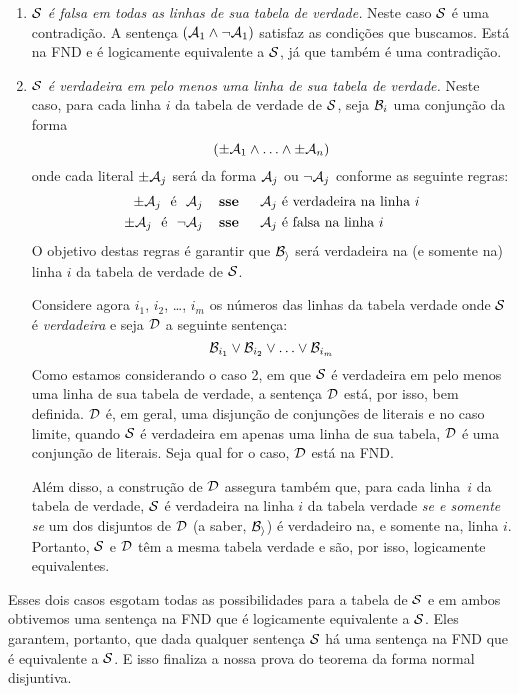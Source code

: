 	\begin{enumerate}
		\item \emph{$\mathcal{S}$ é falsa em todas as linhas de sua tabela de verdade.} Neste caso  $\mathcal{S}$ é uma contradição.
		A sentença $(\mathcal{A}_1 \wedge \neg \mathcal{A}_1)$ satisfaz as condições que buscamos.
		Está na FND e é logicamente equivalente a $\mathcal{S}$, já que também é uma contradição.
	
		\item\emph{$\mathcal{S}$ é verdadeira em pelo menos uma linha de sua tabela de verdade.}
		Neste caso, para cada linha $i$ da tabela de verdade de $\mathcal{S}$, seja $\mathcal{B}_i$ uma conjunção da forma
		$$(\pm\mathcal{A}_{1} \land \ldots \land \pm\mathcal{A}_{n})$$
		onde cada literal $\pm\mathcal{A}_{j}$ será da forma $\mathcal{A}_{j}$ ou $\neg\mathcal{A}_{j}$ conforme as seguinte regras:
			\begin{align*}
				\pm\meta{A}_{j}\text{ \ é \ }\meta{A}_{j}&\emph{ \ \ sse \ \ \ }\meta{A}_{j}\text{ é verdadeira na linha }i\\
				\pm\meta{A}_{j}\text{ \ é \ }\enot\meta{A}_{j}&\emph{ \ \ sse \ \ \ }\meta{A}_{j}\text{ é falsa na linha }i
			\end{align*}
		O objetivo destas regras é garantir que  $\mathcal{B_i}$ será verdadeira na (e somente na) linha $i$ da tabela de verdade de $\mathcal{S}$.
		
		Considere agora  $i_1$, $i_2$, \dots, $i_m$ os números das linhas da tabela verdade onde $\mathcal{S}$ é \emph{verdadeira} e seja $\mathcal{D}$ a seguinte sentença:
		$$\mathcal{B}_{i_1} \vee \mathcal{B}_{i_2} \vee \ldots \vee \mathcal{B}_{i_m}$$
		Como estamos considerando o caso 2, em que $\mathcal{S}$ é verdadeira em pelo menos uma linha de sua tabela de verdade, a sentença $\mathcal{D}$ está, por isso, bem definida.
		$\mathcal{D}$ é, em geral, uma disjunção de conjunções de literais e no caso limite, quando $\mathcal{S}$ é verdadeira em apenas uma linha de sua tabela, $\mathcal{D}$ é uma conjunção de literais.
		Seja qual for o caso, $\mathcal{D}$ está na FND.
		
		Além disso, a construção de $\mathcal{D}$ assegura também que, para cada linha~$i$ da tabela de verdade, $\mathcal{S}$ é verdadeira na linha $i$ da tabela verdade \emph{se e somente se} um dos disjuntos de $\mathcal{D}$ (a saber, $\mathcal{B_i}$) é verdadeiro na, e somente na, linha $i$.
		Portanto, $\mathcal{S}$ e $\mathcal{D}$ têm a mesma tabela verdade e são, por isso, logicamente equivalentes.
	\end{enumerate}
	Esses dois casos esgotam todas as possibilidades para a tabela de $\mathcal{S}$ e em ambos obtivemos uma sentença na FND que é logicamente equivalente a $\mathcal{S}$.
	Eles garantem, portanto, que dada qualquer sentença $\mathcal{S}$ há uma sentença na FND que é equivalente a $\mathcal{S}$. E isso finaliza a nossa prova do teorema da forma normal disjuntiva.

